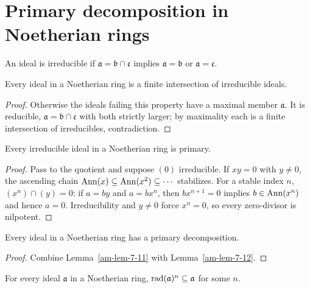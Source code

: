 \section{Primary decomposition in Noetherian rings}
\label{am-ch7-primary}
\begin{definition}
\label{am-def-irreducible-ideal}
\uses{}
An ideal is irreducible if $\mathfrak{a}=\mathfrak{b}\cap\mathfrak{c}$ implies
$\mathfrak{a}=\mathfrak{b}$ or $\mathfrak{a}=\mathfrak{c}$.
\end{definition}
\begin{lemma}
\label{am-lem-7-11}
\uses{}
Every ideal in a Noetherian ring is a finite intersection of irreducible ideals.
\end{lemma}
\begin{proof}
Otherwise the ideals failing this property have a maximal member $\mathfrak{a}$.
It is reducible, $\mathfrak{a}=\mathfrak{b}\cap\mathfrak{c}$ with both strictly larger; by
maximality each is a finite intersection of irreducibles, contradiction.
\end{proof}
\begin{lemma}
\label{am-lem-7-12}
\uses{}
Every irreducible ideal in a Noetherian ring is primary.
\end{lemma}
\begin{proof}
Pass to the quotient and suppose $(0)$ irreducible.  If $xy=0$ with $y\ne0$,
the ascending chain $\operatorname{Ann}(x)\subseteq\operatorname{Ann}(x^2)\subseteq\cdots$ stabilizes.
For a stable index $n$, $(x^n)\cap(y)=0$: if $a=by$ and $a=bx^n$, then
$bx^{n+1}=0$ implies $b\in\operatorname{Ann}(x^n)$ and hence $a=0$.  Irreducibility and
$y\ne0$ force $x^n=0$, so every zero-divisor is nilpotent.
\end{proof}
\begin{theorem}
\label{am-thm-7-13}
\uses{}
Every ideal in a Noetherian ring has a primary decomposition.
\end{theorem}
\begin{proof}
Combine Lemma~\ref{am-lem-7-11} with Lemma~\ref{am-lem-7-12}.
\end{proof}
\begin{proposition}
\label{am-prop-7-14}
\uses{}
For every ideal $\mathfrak{a}$ in a Noetherian ring, $\operatorname{rad}(\mathfrak{a})^n\subseteq\mathfrak{a}$
for some $n$.
\end{proposition}
